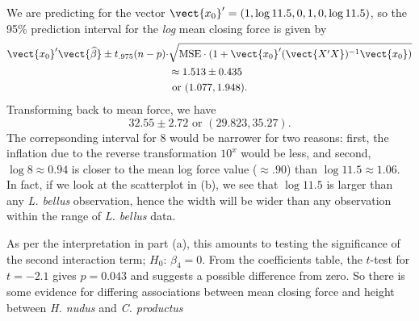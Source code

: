 \documentclass{homework}
\begin{document}
\begin{longproblem}
\begin{solution}
  We are predicting for the vector $\vect{x_0}' = (1,\log 11.5, 0, 1, 0, \log 11.5)$, so the 95\% prediction interval for the \emph{log} mean closing force is given by
\begin{align*}
  \vect{x_0}'\vect{\hat\beta} \pm t_{.975}(n-p)\cdot&\sqrt{\MSE\cdot (1 + \vect{x_0}'(\vect{X'X})^{-1}\vect {x_0})} \\
  &\approx 1.513 \pm 0.435 \\&\text{ or }( 1.077, 1.948 ).
\end{align*}
Transforming back to mean force, we have
$$
  32.55 \pm 2.72\text{ or }( 29.823, 35.27 ).
$$
The correpsonding interval for $8$ would be narrower for two reasons: first, the inflation due to the reverse transformation $10^x$ would be less, and second, $\log 8\approx 0.94$ is closer to the mean log force value ($\approx .90$) than $\log 11.5 \approx 1.06$.  In fact, if we look at the scatterplot in (b), we see that $\log 11.5$ is larger than any \emph{L. bellus} observation, hence the width will be wider than any observation within the range of \emph{L. bellus} data.
\end{solution}

\begin{solution}
  As per the interpretation in part (a), this amounts to testing the significance of the second interaction term; $H_0:\,\beta_4=0$. From the coefficients table, the $t$-test for $t=-2.1$ gives $p=0.043$ and suggests a possible difference from zero.  So there is some evidence for differing associations between mean closing force and height between \emph{H. nudus} and \emph{C. productus}
\end{solution}


\end{longproblem}
\end{document}

